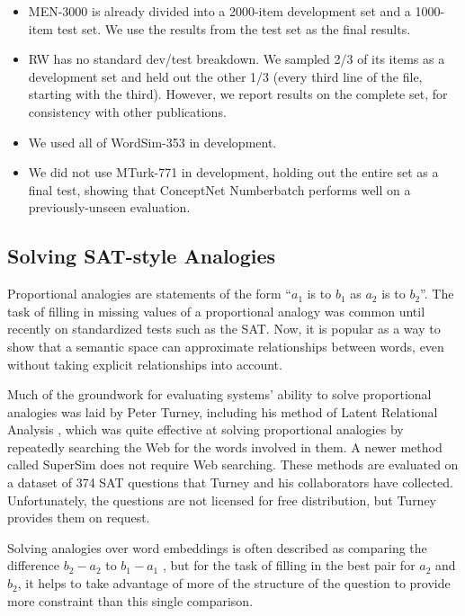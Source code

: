 \documentclass[letterpaper]{article}
\begin{document}
\begin{itemize}
\item
    MEN-3000 is already divided into a 2000-item development set and a
    1000-item test set. We use the results from the test set as the final results.
\item
    RW has no standard dev/test breakdown. We sampled 2/3 of its items as
    a development set and held out the other 1/3 (every third line of the file,
    starting with the third). However, we report results on the complete set,
    for consistency with other publications.
\item
    We used all of WordSim-353 in development.
\item
    We did not use MTurk-771 in development, holding out the entire set
    as a final test, showing that ConceptNet Numberbatch performs well on a
    previously-unseen evaluation.
\end{itemize}

\subsection{Solving SAT-style Analogies}

Proportional analogies are statements of the form ``$a_1$ is to $b_1$ as $a_2$
is to $b_2$''. The task of filling in missing values of a proportional analogy
was common until recently on standardized tests such as the SAT. Now, it is
popular as a way to show that a semantic space can approximate relationships
between words, even without taking explicit relationships into account.

Much of the groundwork for evaluating systems' ability to solve proportional
analogies was laid by Peter Turney, including his method of Latent Relational
Analysis \cite{turney2005lra}, which was quite effective at solving
proportional analogies by repeatedly searching the Web for the words involved
in them. A newer method called SuperSim \cite{turney2013distributional} does
not require Web searching. These methods are evaluated on a dataset of 374 SAT
questions that Turney and his collaborators have collected. Unfortunately, the
questions are not licensed for free distribution, but Turney provides them on
request.

Solving analogies over word embeddings is often described as comparing the
difference $b_2 - a_2$ to $b_1 - a_1$ \cite{mikolov2013word2vec}, but for the
task of filling in the best pair for $a_2$ and $b_2$, it helps to take
advantage of more of the structure of the question to provide more constraint
than this single comparison.
\end{document}

